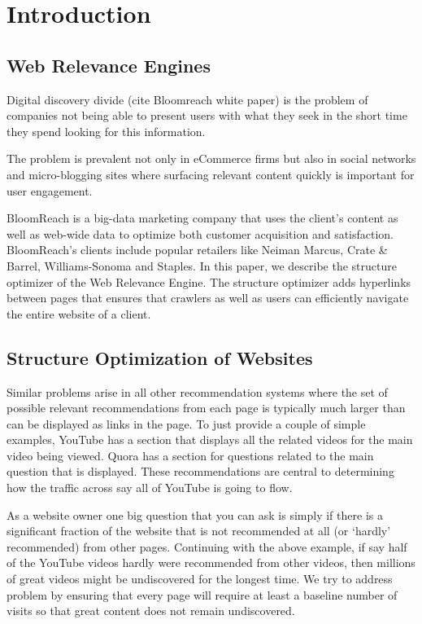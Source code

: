 \section{Introduction}

\subsection{Web Relevance Engines}
Digital discovery divide (cite Bloomreach white paper) is the problem of companies not being able to present users with what they seek in the short time they spend looking for this information.

The problem is prevalent not only in eCommerce firms but also in social networks and micro-blogging sites where surfacing relevant content quickly is important for user engagement.

BloomReach is a big-data marketing company that uses the client's content as well as web-wide data to optimize both customer acquisition and satisfaction.
BloomReach's clients include popular retailers like Neiman Marcus, Crate \& Barrel, Williams-Sonoma and Staples. In this paper, we describe the structure optimizer of the Web Relevance Engine.
The structure optimizer adds hyperlinks between pages that ensures that crawlers as well as users can efficiently navigate the entire website of a client. 

\subsection{Structure Optimization of Websites}
Similar problems arise in all other recommendation systems where the set of possible relevant recommendations from each page is typically much larger than can be displayed as links in the page. 
To just provide a couple of simple examples, YouTube has a section that displays all the related videos for the main video being viewed. Quora has a section for questions related to the main question
that is displayed. These recommendations are central to determining how the traffic across say all of YouTube is going to flow.

As a website owner one big question that you can ask is simply if there is a significant fraction of the website that is not recommended at all (or `hardly' recommended) from other pages. Continuing
with the above example, if say half of the YouTube videos hardly were recommended from other videos, then millions of great videos might be undiscovered for the longest time. We try to address
problem by ensuring that every page will require at least a baseline number of visits so that great content does not remain undiscovered. 


